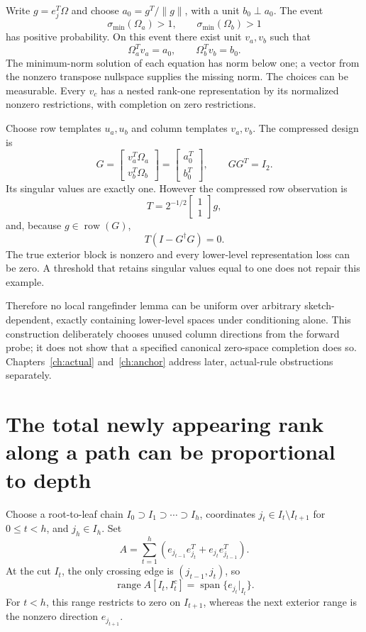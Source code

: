 \documentclass[11pt,oneside,openany,a4paper]{book}
\numberwithin{equation}{chapter}
\theoremstyle{definition}
\theoremstyle{remark}
\begin{document}
Write $g=e_j^T\Omega$ and choose $a_0=g^T/\|g\|$, with a unit $b_0\perp a_0$. The event
\[
 \sigma_{\min}(\Omega_a)>1,\qquad\sigma_{\min}(\Omega_b)>1
\]
has positive probability. On this event there exist unit $v_a,v_b$ such that
\[
 \Omega_a^Tv_a=a_0,\qquad\Omega_b^Tv_b=b_0.
\]
The minimum-norm solution of each equation has norm below one; a vector from the nonzero transpose nullspace supplies the missing norm. The choices can be measurable. Every $v_c$ has a nested rank-one representation by its normalized nonzero restrictions, with completion on zero restrictions.

Choose row templates $u_a,u_b$ and column templates $v_a,v_b$. The compressed design is
\[
 G=\begin{bmatrix}v_a^T\Omega_a\\v_b^T\Omega_b\end{bmatrix}
 =\begin{bmatrix}a_0^T\\b_0^T\end{bmatrix},\qquad GG^T=I_2.
\]
Its singular values are exactly one. However the compressed row observation is
\[
 T=2^{-1/2}\begin{bmatrix}1\\1\end{bmatrix}g,
\]
and, because $g\in\operatorname{row}(G)$,
\begin{equation}\label{basisobs:eq:erasure}
 \boxed{T(I-G^\dagger G)=0.}
\end{equation}
The true exterior block is nonzero and every lower-level representation loss can be zero. A threshold that retains singular values equal to one does not repair this example.

Therefore no local rangefinder lemma can be uniform over arbitrary sketch-dependent, exactly containing lower-level spaces under conditioning alone. This construction deliberately chooses unused column directions from the forward probe; it does not show that a specified canonical zero-space completion does so. Chapters~\ref{ch:actual} and~\ref{ch:anchor} address later, actual-rule obstructions separately.

\section{The total newly appearing rank along a path can be proportional to depth}
Choose a root-to-leaf chain $I_0\supset I_1\supset\cdots\supset I_h$, coordinates $j_t\in I_t\setminus I_{t+1}$ for $0\le t<h$, and $j_h\in I_h$. Set
\[
 A=\sum_{t=1}^{h}\left(e_{j_{t-1}}e_{j_t}^T+e_{j_t}e_{j_{t-1}}^T\right).
\]
At the cut $I_t$, the only crossing edge is $(j_{t-1},j_t)$, so
\[
 \operatorname{range}A[I_t,I_t^c]
 =\operatorname{span}\{e_{j_t}|_{I_t}\}.
\]
For $t<h$, this range restricts to zero on $I_{t+1}$, whereas the next exterior range is the nonzero direction $e_{j_{t+1}}$.
\end{document}
